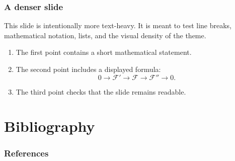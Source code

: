 \begin{frame}
    \frametitle{A denser slide}

    This slide is intentionally more text-heavy. It is meant to test line breaks,
    mathematical notation, lists, and the visual density of the theme.

    \begin{enumerate}
        \item The first point contains a short mathematical statement.
        \item The second point includes a displayed formula:
            \[
                0 \to \mathscr{F}' \to \mathscr{F} \to \mathscr{F}'' \to 0.
            \]
        \item The third point checks that the slide remains readable.
    \end{enumerate}
\end{frame}

\section{Bibliography}

\begin{frame}[allowframebreaks]
    \frametitle{References}
    \printbibliography
\end{frame}


